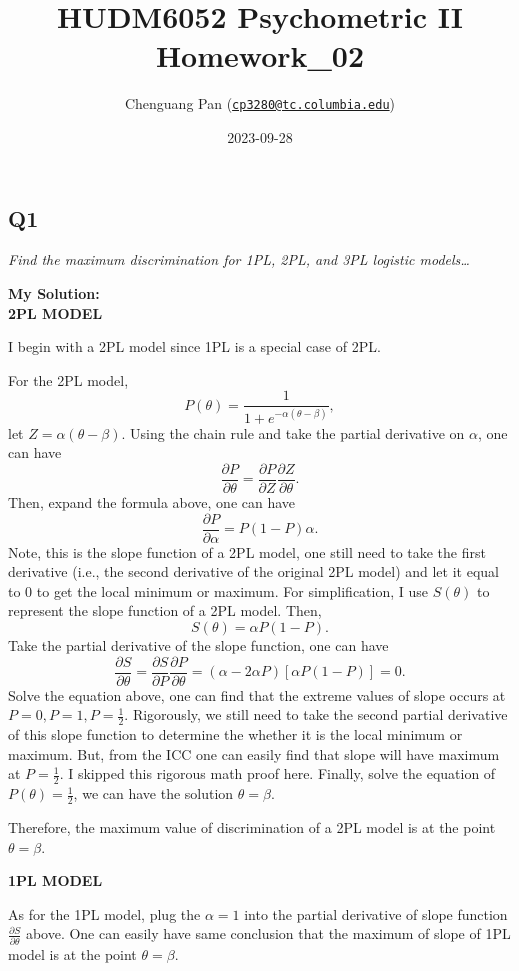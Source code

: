 \documentclass[
]{article}
\title{HUDM6052 Psychometric II Homework\_02}
\author{Chenguang Pan
(\href{mailto:cp3280@tc.columbia.edu}{\nolinkurl{cp3280@tc.columbia.edu}})}
\date{2023-09-28}
\begin{document}
\maketitle

\setcounter{tocdepth}{4}
\tableofcontents

\hypertarget{q1}{%
\subsection{Q1}\label{q1}}

\emph{Find the maximum discrimination for 1PL, 2PL, and 3PL logistic
models\ldots{}}

\textbf{My Solution:}\\
\textbf{2PL MODEL}

I begin with a 2PL model since 1PL is a special case of 2PL.

For the 2PL model, \[P(\theta)=\frac{1}{1+e^{-\alpha(\theta-\beta)}},\]
let \(Z = \alpha(\theta-\beta)\). Using the chain rule and take the
partial derivative on \(\alpha\), one can have
\[\frac{\partial P}{\partial \theta}=\frac{\partial P}{\partial Z}\frac{\partial Z}{\partial \theta}. \]
Then, expand the formula above, one can have
\[\frac{\partial P}{\partial \alpha}=P(1-P)\alpha.\] Note, this is the
slope function of a 2PL model, one still need to take the first
derivative (i.e., the second derivative of the original 2PL model) and
let it equal to 0 to get the local minimum or maximum. For
simplification, I use \(S(\theta)\) to represent the slope function of a
2PL model. Then, \[S(\theta) = \alpha P(1-P).\] Take the partial
derivative of the slope function, one can have
\[\frac{\partial S}{\partial\theta} = \frac{\partial S}{\partial P}\frac{\partial P}{\partial\theta} = (\alpha-2\alpha P)[\alpha P(1-P)]=0.\]
Solve the equation above, one can find that the extreme values of slope
occurs at \(P=0, P=1, P=\frac{1}{2}\). Rigorously, we still need to take
the second partial derivative of this slope function to determine the
whether it is the local minimum or maximum. But, from the ICC one can
easily find that slope will have maximum at \(P=\frac{1}{2}\). I skipped
this rigorous math proof here. Finally, solve the equation of
\(P(\theta)=\frac{1}{2}\), we can have the solution \(\theta = \beta\).

Therefore, the maximum value of discrimination of a 2PL model is at the
point \(\theta =\beta.\)

\textbf{1PL MODEL}

As for the 1PL model, plug the \(\alpha = 1\) into the partial
derivative of slope function \(\frac{\partial S}{\partial\theta}\)
above. One can easily have same conclusion that the maximum of slope of
1PL model is at the point \(\theta = \beta\).
\end{document}
